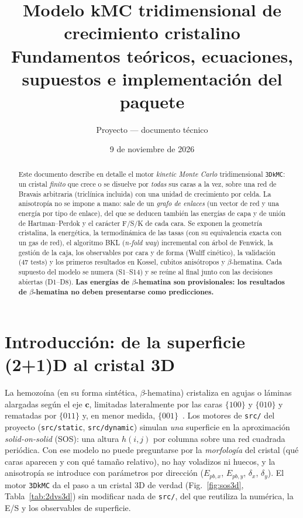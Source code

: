 \documentclass[11pt,a4paper]{article}
\title{\vspace{-0.6cm}\textbf{Modelo kMC tridimensional de crecimiento cristalino}\\[2pt]
\large Fundamentos teóricos, ecuaciones, supuestos e implementación del paquete \code{3DkMC/kmc3d}}
\author{Proyecto \code{kMC\_Malaria} --- documento técnico}
\date{9 de noviembre de 2026}
\newcommand{\code}[1]{\texttt{#1}}
\newcommand{\vect}[1]{\mathbf{#1}}
\newcommand{\bh}{$\beta$-hematina}
\begin{document}
\maketitle
\vspace{-0.5cm}

\begin{abstract}
\noindent Este documento describe en detalle el motor \emph{kinetic Monte Carlo} tridimensional
\code{3DkMC}: un cristal \emph{finito} que crece o se disuelve por \emph{todas} sus caras a la vez,
sobre una red de Bravais arbitraria (triclínica incluida) con una unidad de crecimiento por
celda. La anisotropía no se impone a mano: sale de un \emph{grafo de enlaces} (un vector de red
y una energía por tipo de enlace), del que se deducen también las energías de capa y de unión de
Hartman--Perdok y el carácter F/S/K de cada cara. Se exponen la geometría cristalina, la energética,
la termodinámica de las tasas (con su equivalencia exacta con un gas de red), el algoritmo BKL
(\emph{n-fold way}) incremental con árbol de Fenwick, la gestión de la caja, los observables por
cara y de forma (Wulff cinético), la validación (47 tests) y los primeros resultados en Kossel,
cubitos anisótropos y \bh{}. Cada supuesto del modelo se numera (S1--S14) y se reúne al final
junto con las decisiones abiertas (D1--D8). \textbf{Las energías de \bh{} son provisionales: los
resultados de \bh{} no deben presentarse como predicciones.}
\end{abstract}

\setcounter{tocdepth}{2}
{\small\tableofcontents}

\section{Introducción: de la superficie (2+1)D al cristal 3D}
\label{sec:intro}

La hemozoína (en su forma sintética, \bh{}) cristaliza en agujas o láminas alargadas según el eje
$\vect c$, limitadas lateralmente por las caras $\{100\}$ y $\{010\}$ y rematadas por $\{011\}$ y,
en menor medida, $\{001\}$~\cite{solomonov2007}. Los motores de \code{src/} del proyecto
(\code{src/static}, \code{src/dynamic}) simulan \emph{una} superficie en la aproximación
\emph{solid-on-solid} (SOS): una altura $h(i,j)$ por columna sobre una red cuadrada periódica. Con
ese modelo no puede preguntarse por la \emph{morfología} del cristal (qué caras aparecen y con qué
tamaño relativo), no hay voladizos ni huecos, y la anisotropía se introduce con parámetros por
dirección ($E_{pb,x}$, $E_{pb,y}$, $\delta_x$, $\delta_y$). El motor \code{3DkMC} da el paso a un
cristal 3D de verdad (Fig.~\ref{fig:sos3d}, Tabla~\ref{tab:2dvs3d}) sin modificar nada de
\code{src/}, del que reutiliza la numérica, la E/S y los observables de superficie.
\end{document}
